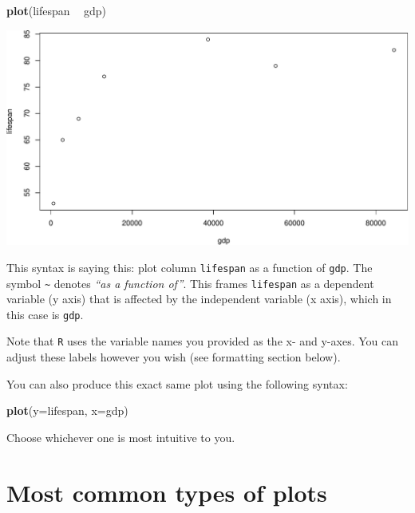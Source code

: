\documentclass[
]{book}
\newenvironment{Shaded}{\begin{snugshade}}{\end{snugshade}}
\newcommand{\DataTypeTok}[1]{\textcolor[rgb]{0.13,0.29,0.53}{#1}}
\newcommand{\KeywordTok}[1]{\textcolor[rgb]{0.13,0.29,0.53}{\textbf{#1}}}
\newcommand{\NormalTok}[1]{#1}
\newcommand{\OperatorTok}[1]{\textcolor[rgb]{0.81,0.36,0.00}{\textbf{#1}}}
\newcommand{\StringTok}[1]{\textcolor[rgb]{0.31,0.60,0.02}{#1}}
\begin{document}
\begin{Shaded}
\begin{Highlighting}[]
\KeywordTok{plot}\NormalTok{(lifespan }\OperatorTok{~}\StringTok{ }\NormalTok{gdp)}
\end{Highlighting}
\end{Shaded}

\includegraphics{figures/unnamed-chunk-220-1.pdf}

This syntax is saying this: plot column \texttt{lifespan} as a function of \texttt{gdp}. The symbol \texttt{\textasciitilde{}} denotes \emph{``as a function of''}. This frames \texttt{lifespan} as a dependent variable (y axis) that is affected by the independent variable (x axis), which in this case is \texttt{gdp}.

Note that \texttt{R} uses the variable names you provided as the x- and y-axes. You can adjust these labels however you wish (see formatting section below).

You can also produce this exact same plot using the following syntax:

\begin{Shaded}
\begin{Highlighting}[]
\KeywordTok{plot}\NormalTok{(}\DataTypeTok{y=}\NormalTok{lifespan, }\DataTypeTok{x=}\NormalTok{gdp)}
\end{Highlighting}
\end{Shaded}

Choose whichever one is most intuitive to you.

\hypertarget{most-common-types-of-plots}{%
\section*{Most common types of plots}\label{most-common-types-of-plots}}
\end{document}
